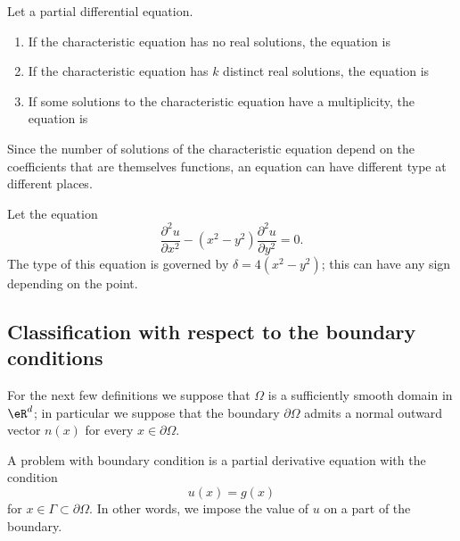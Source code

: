 \begin{definition}
	Let a partial differential equation.
	\begin{enumerate}
		\item
		      If the characteristic equation has no real solutions, the equation is 
		\item
		      If the characteristic equation has \( k\) distinct real solutions, the equation is 
		\item
		      If some solutions to the characteristic equation have a multiplicity, the equation is 
	\end{enumerate}
\end{definition}

Since the number of solutions of the characteristic equation depend on the coefficients that are themselves functions, an equation can have different type at different places.

\begin{example}
	Let the equation
	\begin{equation}
		\frac{ \partial^2u }{ \partial x^2 }-(x^2-y^2)\frac{ \partial^2u }{ \partial y^2 }=0.
	\end{equation}
	The type of this equation is governed by \( \delta=4(x^2-y^2)\); this can have any sign depending on the point.
\end{example}

\subsection{Classification with respect to the boundary conditions}

For the next few definitions we suppose that \( \Omega\) is a sufficiently smooth domain in \( \eR^d\); in particular we suppose that the boundary \( \partial\Omega\) admits a normal outward vector \( n(x)\) for every \( x\in \partial\Omega\).

\begin{definition}
	A problem with  boundary condition is a partial derivative equation with the condition
	\begin{equation}
		u(x)=g(x)
	\end{equation}
	for \( x\in\Gamma\subset\partial\Omega\). In other words, we impose the value of \( u\) on a part of the boundary.
\end{definition}

